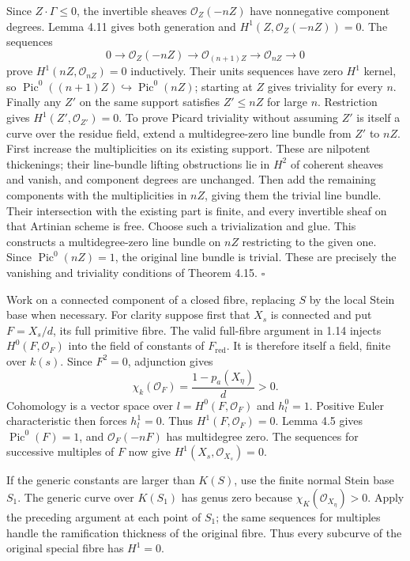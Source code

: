 \documentclass[11pt]{article}
\let\chapterexercise\exercise
\renewcommand{\exercise}[2]{\Needspace{8\baselineskip}\chapterexercise{#1}{#2}}
\begin{document}
Since $Z\cdot\Gamma\le0$, the invertible sheaves $\mathcal O_Z(-nZ)$ have nonnegative component degrees. Lemma 4.11 gives both generation and $H^1(Z,\mathcal O_Z(-nZ))=0$. The sequences
\[ 0\to\mathcal O_Z(-nZ)\to\mathcal O_{(n+1)Z}\to\mathcal O_{nZ}\to0 \]
prove $H^1(nZ,\mathcal O_{nZ})=0$ inductively. Their units sequences have zero $H^1$ kernel, so $\operatorname{Pic}^0((n+1)Z)\hookrightarrow\operatorname{Pic}^0(nZ)$; starting at $Z$ gives triviality for every $n$. Finally any $Z'$ on the same support satisfies $Z'\le nZ$ for large $n$. Restriction gives $H^1(Z',\mathcal O_{Z'})=0$. To prove Picard triviality without assuming $Z'$ is itself a curve over the residue field, extend a multidegree-zero line bundle from $Z'$ to $nZ$. First increase the multiplicities on its existing support. These are nilpotent thickenings; their line-bundle lifting obstructions lie in $H^2$ of coherent sheaves and vanish, and component degrees are unchanged. Then add the remaining components with the multiplicities in $nZ$, giving them the trivial line bundle. Their intersection with the existing part is finite, and every invertible sheaf on that Artinian scheme is free. Choose such a trivialization and glue. This constructs a multidegree-zero line bundle on $nZ$ restricting to the given one. Since $\operatorname{Pic}^0(nZ)=1$, the original line bundle is trivial. These are precisely the vanishing and triviality conditions of Theorem 4.15. \hfill$\square$

\pf Work on a connected component of a closed fibre, replacing $S$ by the local Stein base when necessary. For clarity suppose first that $X_s$ is connected and put $F=X_s/d$, its full primitive fibre. The valid full-fibre argument in 1.14 injects $H^0(F,\mathcal O_F)$ into the field of constants of $F_{\mathrm{red}}$. It is therefore itself a field, finite over $k(s)$. Since $F^2=0$, adjunction gives
\[ \chi_k(\mathcal O_F)=\frac{1-p_a(X_\eta)}d>0. \]
Cohomology is a vector space over $l=H^0(F,\mathcal O_F)$ and $h_l^0=1$. Positive Euler characteristic then forces $h_l^1=0$. Thus $H^1(F,\mathcal O_F)=0$. Lemma 4.5 gives $\operatorname{Pic}^0(F)=1$, and $\mathcal O_F(-nF)$ has multidegree zero. The sequences for successive multiples of $F$ now give $H^1(X_s,\mathcal O_{X_s})=0$.

If the generic constants are larger than $K(S)$, use the finite normal Stein base $S_1$. The generic curve over $K(S_1)$ has genus zero because $\chi_K(\mathcal O_{X_\eta})>0$. Apply the preceding argument at each point of $S_1$; the same sequences for multiples handle the ramification thickness of the original fibre. Thus every subcurve of the original special fibre has $H^1=0$.
\end{document}
